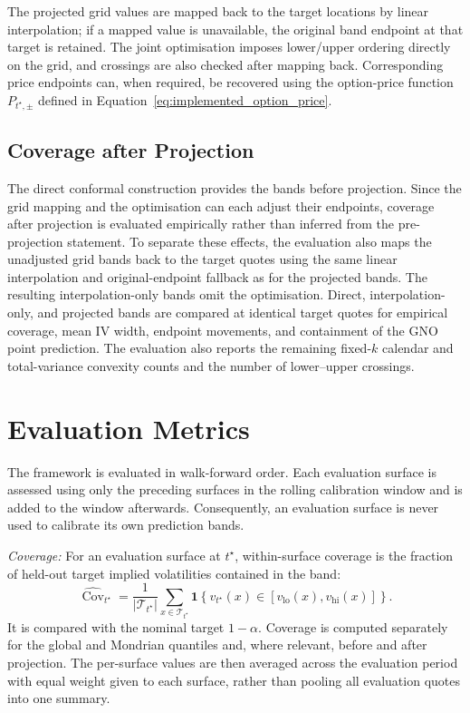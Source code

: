 The projected grid values are mapped back to the target locations by linear interpolation; if a mapped value is unavailable, the original band endpoint at that target is retained. The joint optimisation imposes lower/upper ordering directly on the grid, and crossings are also checked after mapping back. Corresponding price endpoints can, when required, be recovered using the option-price function $P_{t^\star,\pm}$ defined in Equation~\eqref{eq:implemented_option_price}.

\subsection{Coverage after Projection}
\label{subsec:coverage_projection}

The direct conformal construction provides the bands before projection. Since the grid mapping and the optimisation can each adjust their endpoints, coverage after projection is evaluated empirically rather than inferred from the pre-projection statement. To separate these effects, the evaluation also maps the unadjusted grid bands back to the target quotes using the same linear interpolation and original-endpoint fallback as for the projected bands. The resulting interpolation-only bands omit the optimisation. Direct, interpolation-only, and projected bands are compared at identical target quotes for empirical coverage, mean IV width, endpoint movements, and containment of the GNO point prediction. The evaluation also reports the remaining fixed-$k$ calendar and total-variance convexity counts and the number of lower--upper crossings.

\section{Evaluation Metrics}
\label{sec:meth_metrics}

The framework is evaluated in walk-forward order. Each evaluation surface is assessed using only the preceding surfaces in the rolling calibration window and is added to the window afterwards. Consequently, an evaluation surface is never used to calibrate its own prediction bands.

\textit{Coverage:} For an evaluation surface at $t^\star$, within-surface coverage is the fraction of held-out target implied volatilities contained in the band:
\begin{equation}
    \widehat{\operatorname{Cov}}_{t^\star}
    =\frac{1}{|\mathcal{T}_{t^\star}|}
    \sum_{x\in\mathcal{T}_{t^\star}}
    \mathbf{1}\!\left\{v_{t^\star}(x)\in
    [v_{\text{lo}}(x),v_{\text{hi}}(x)]\right\}.
    \label{eq:empirical_coverage}
\end{equation}
It is compared with the nominal target $1-\alpha$. Coverage is computed separately for the global and Mondrian quantiles and, where relevant, before and after projection. The per-surface values are then averaged across the evaluation period with equal weight given to each surface, rather than pooling all evaluation quotes into one summary.

